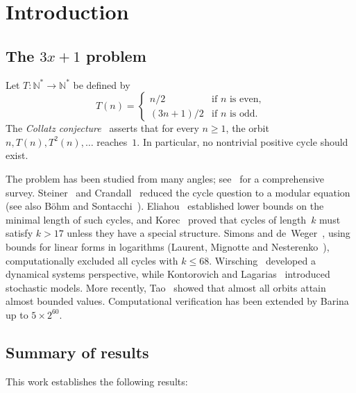 \documentclass[12pt, a4paper]{amsart}
\theoremstyle{plain}
\theoremstyle{definition}
\theoremstyle{remark}
\newcommand{\N}{\mathbb{N}}
\begin{document}
\section{Introduction}\label{sec:intro}

\subsection{The $3x+1$ problem}

Let $T \colon \N^* \to \N^*$ be defined by
\begin{equation}\label{eq:collatz}
  T(n) = \begin{cases}
    n/2       & \text{if } n \text{ is even,} \\
    (3n+1)/2  & \text{if } n \text{ is odd.}
  \end{cases}
\end{equation}
The \emph{Collatz conjecture}~\cite{Lagarias1985} asserts that for
every $n \geq 1$, the orbit $n, T(n), T^2(n), \ldots$ reaches~$1$.
In particular, no nontrivial positive cycle should exist.

The problem has been studied from many angles;
see~\cite{Lagarias2010} for a comprehensive survey.
Steiner~\cite{Steiner1977} and
Crandall~\cite{Crandall1978} reduced the cycle question to
a modular equation
(see also B\"ohm and Sontacchi~\cite{BoehmSontacchi1978}).
Eliahou~\cite{Eliahou1993} established lower bounds on the
minimal length of such cycles,
and Korec~\cite{Korec1994} proved that cycles of length~$k$
must satisfy $k > 17$ unless they have a special structure.
Simons and de~Weger~\cite{SimonsDeWeger2005}, using bounds
for linear forms in logarithms
(Laurent, Mignotte and Nesterenko~\cite{LMN1995}),
computationally excluded all cycles with $k \leq 68$.
Wirsching~\cite{Wirsching1998} developed a dynamical systems
perspective, while
Kontorovich and Lagarias~\cite{KontorovichLagarias2010}
introduced stochastic models.
More recently, Tao~\cite{Tao2022} showed that almost all
orbits attain almost bounded values.
Computational verification has been extended by
Barina~\cite{Barina2021} up to $5 \times 2^{60}$.

\subsection{Summary of results}

This work establishes the following results:
\end{document}
